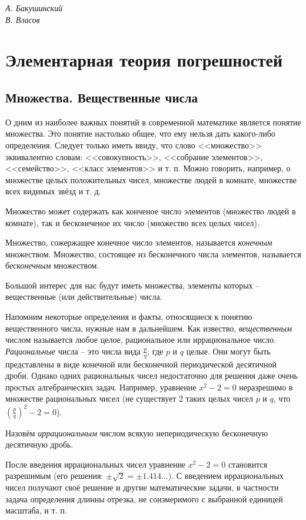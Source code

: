 \begin{flushright}
	\textit{А. Бакушинский\\
		В. Власов
	}
\end{flushright}
\chapter{Элементарная теория погрешностей}
\section{Множества. Вещественные числа}

\lettrine[lines=3]{О}{}
дним из наиболее важных понятий в современной математике является понятие
множества. Это понятие настолько общее, что ему нельзя дать какого-либо
определения. Следует только иметь ввиду, что слово <<множество>> эквивалентно
словам: <<совокупность>>, <<собрание элементов>>, <<семейство>>, <<класс
элементов>> и т. п. Можно говорить, например, о множестве целых положительных
чисел, множестве людей в комнате, множестве всех видимых звёзд и т. д.

Множество может содержать как конченое число элементов (множество людей в
комнате), так и бесконеченое их число (множество всех целых чисел).

Множество, сожержащее конечное число элементов, называется \textit{конечным}
множеством. Множество, состоящее из бесконечного числа элементов, называется
\textit{бесконечным} множеством.

Большой интерес для нас будут иметь множества, элементы которых -- вещественные
(или действительные) числа.

Напомним некоторые определения и факты, относящиеся к понятию вещественного
числа, нужные нам в дальнейшем. Как извество, \textit{вещественным} числом
называется любое целое, рациональное или иррациональное число.
\textit{Рациональные} числа -- это числа вида $\frac{p}{q}$, где $p$ и $q$
целые. Они могут быть представлены в виде конечной или бесконечной периодической
десятичной дроби. Однако одних рациональных чисел недостаточно для решения даже
очень простых алгебраических задач. Например, уравнение $x^2 - 2 = 0$
неразрешимо в множестве рациональных чисел (не существует 2 таких целых чисел
$p$ и $q$, что $(\frac{p}{q})^2 - 2 = 0$).

Назовём \textit{иррациональным} числом всякую непериодическую бесконечную
десятичную дробь.

После введения иррациональных чисел уравнение $x^2 - 2 = 0$ становится
разрешимым (его решения: $\pm\sqrt{2} = \pm 1.414\ldots$). С введением
иррациональных чисел получают своё решение и другие математические задачи, в
частности задача определения длинны отрезка, не соизмеримого с выбранной
единицей масштаба, и т. п.

